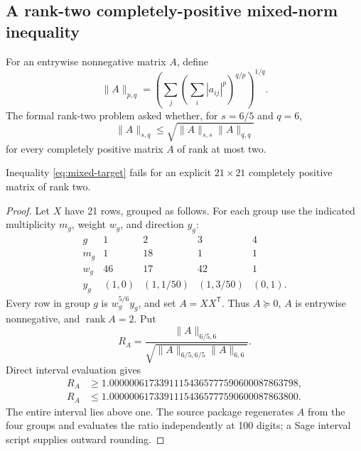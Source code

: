 \subsection{A rank-two completely-positive mixed-norm inequality}

For an entrywise nonnegative matrix $A$, define
\[
\|A\|_{p,q}=\left(\sum_j\left(\sum_i |a_{ij}|^p\right)^{q/p}\right)^{1/q}.
\]
The formal rank-two problem asked whether, for $s=6/5$ and $q=6$,
\begin{equation}\label{eq:mixed-target}
\|A\|_{s,q}\le\sqrt{\|A\|_{s,s}\|A\|_{q,q}}
\end{equation}
for every completely positive matrix $A$ of rank at most two.

\begin{theorem}\label{thm:mixed}
Inequality \eqref{eq:mixed-target} fails for an explicit $21\times21$ completely positive matrix of rank two.
\end{theorem}
\begin{proof}
Let $X$ have 21 rows, grouped as follows.  For each group use the indicated multiplicity $m_g$, weight $w_g$, and direction $y_g$:
\[
\begin{array}{c|cccc}
g&1&2&3&4\\ \hline
m_g&1&18&1&1\\
w_g&46&17&42&1\\
y_g&(1,0)&(1,1/50)&(1,3/50)&(0,1).
\end{array}
\]
Every row in group $g$ is $w_g^{5/6}y_g$, and set $A=XX^{\mathsf T}$.  Thus $A\succeq0$, $A$ is entrywise nonnegative, and $\operatorname{rank}A=2$.  Put
\[
R_A=\frac{\|A\|_{6/5,6}}
{\sqrt{\|A\|_{6/5,6/5}\|A\|_{6,6}}}.
\]
Direct interval evaluation gives
\begin{align*}
R_A&\ge 1.00000061733911154365777590600087863798,\\
R_A&\le 1.00000061733911154365777590600087863800.
\end{align*}
The entire interval lies above one.  The source package regenerates $A$ from the four groups and evaluates the ratio independently at 100 digits; a Sage interval script supplies outward rounding.
\end{proof}
